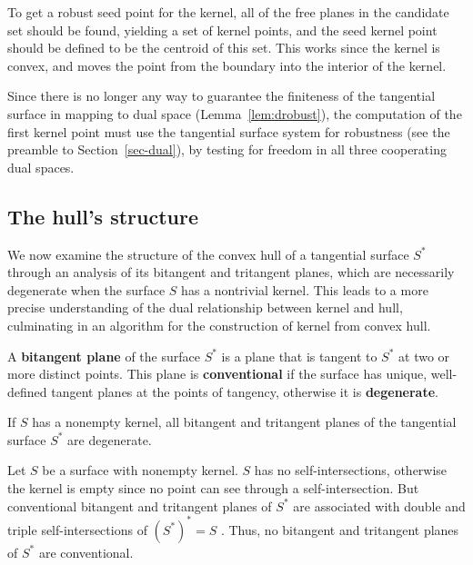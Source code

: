 \documentclass[doublespacing]{elsart}
\begin{document}
To get a robust seed point for the kernel,
all of the free planes in the candidate set should be found,
yielding a set of kernel points, and the seed kernel point 
should be defined to be the centroid of this set.
This works since the kernel is convex, and moves the point from the boundary
into the interior of the kernel.

Since there is no longer any way to guarantee the finiteness of the tangential surface
in mapping to dual space (Lemma~\ref{lem:drobust}),
the computation of the first kernel point must use the tangential surface system 
for robustness (see the preamble to Section~\ref{sec-dual}),
by testing for freedom in all three cooperating dual spaces.


\subsection{The hull's structure}
\label{sec:cusp}

We now examine the structure of the convex hull of a tangential
surface $S^*$ through an analysis of its bitangent and tritangent planes,
which are necessarily degenerate when the surface $S$ has a nontrivial kernel.
This leads to a more precise understanding of the 
dual relationship between kernel and hull, culminating in an
algorithm for the construction of kernel from convex hull.

\begin{defn2}
A {\bf bitangent plane} of the surface $S^*$ is a plane that
is tangent to $S^*$ at two or more distinct points.
This plane is {\bf conventional} if the surface has unique, well-defined 
tangent planes at the points of tangency,
otherwise it is {\bf degenerate}.
\end{defn2}

\begin{lemma}
If $S$ has a nonempty kernel, all bitangent and tritangent planes 
of the tangential surface $S^*$ are degenerate.
\end{lemma}
\prf
Let $S$ be a surface with nonempty kernel.
$S$ has no self-intersections, otherwise the kernel is empty
since no point can see through a self-intersection.
But conventional bitangent and tritangent planes of $S^*$ are associated
with double and triple self-intersections of $(S^*)^* = S$ \cite{jj02,jj03tangsurf}.
Thus, no bitangent and tritangent planes of $S^*$ are conventional.
\QED
\end{document}
